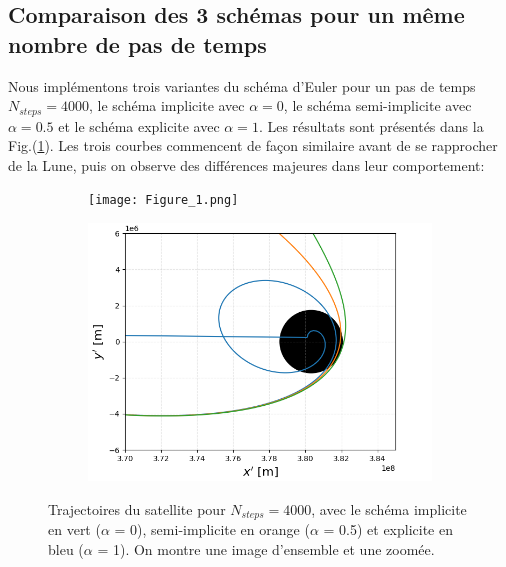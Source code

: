 \documentclass[a4paper,12pt,twoside]{article}
\begin{document}
\subsection{Comparaison des 3 schémas pour un même nombre de pas de temps}
Nous implémentons trois variantes du schéma d'Euler pour un pas de temps $N_{steps}=4000$, le schéma implicite avec $\alpha=0$, le schéma semi-implicite avec $\alpha=0.5$ et le schéma explicite avec $\alpha=1$. Les résultats sont présentés dans la Fig.(\ref{fig1}). Les trois courbes commencent de façon similaire avant de se rapprocher de la Lune, puis on observe des différences majeures dans leur comportement:

\begin{figure}[H]
\begin{subfigure}{0.45\textwidth}  %
    \centering  %
    \texttt{[image: Figure\_1.png]}
\end{subfigure}
\hspace{0.05\textwidth}
\begin{subfigure}{0.45\textwidth}  %
    \centering  %
    \includegraphics[scale=0.45]{Graphes/Trajectoire_zoom.png}
\end{subfigure}
\captionsetup{justification=centering}
\caption{Trajectoires du satellite pour $N_{steps} = 4000$, avec le schéma implicite en vert ($\alpha$ = 0), semi-implicite en orange ($\alpha$ = 0.5) et explicite en bleu ($\alpha$ = 1). On montre une image d'ensemble et une zoomée.}
\label{fig1}
\end{figure}
\end{document}

